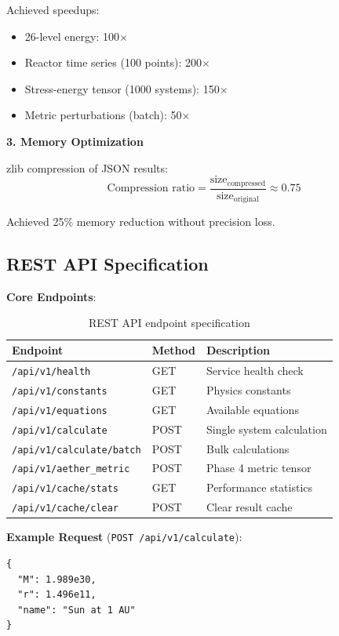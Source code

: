 \documentclass[12pt,a4paper]{article}
\begin{document}
Achieved speedups:
\begin{itemize}
    \item 26-level energy: 100$\times$
    \item Reactor time series (100 points): 200$\times$
    \item Stress-energy tensor (1000 systems): 150$\times$
    \item Metric perturbations (batch): 50$\times$
\end{itemize}

\textbf{3. Memory Optimization}

zlib compression of JSON results:
\begin{equation}
\text{Compression ratio} = \frac{\text{size}_{\text{compressed}}}{\text{size}_{\text{original}}} \approx 0.75
\end{equation}

Achieved 25\% memory reduction without precision loss.

\subsection{REST API Specification}

\textbf{Core Endpoints}:

\begin{table}[H]
\centering
\begin{tabular}{@{}llp{5cm}@{}}
\toprule
\textbf{Endpoint} & \textbf{Method} & \textbf{Description} \\
\midrule
\texttt{/api/v1/health} & GET & Service health check \\
\texttt{/api/v1/constants} & GET & Physics constants \\
\texttt{/api/v1/equations} & GET & Available equations \\
\texttt{/api/v1/calculate} & POST & Single system calculation \\
\texttt{/api/v1/calculate/batch} & POST & Bulk calculations \\
\texttt{/api/v1/aether\_metric} & POST & Phase 4 metric tensor \\
\texttt{/api/v1/cache/stats} & GET & Performance statistics \\
\texttt{/api/v1/cache/clear} & POST & Clear result cache \\
\bottomrule
\end{tabular}
\caption{REST API endpoint specification}
\label{tab:api_endpoints}
\end{table}

\textbf{Example Request} (\texttt{POST /api/v1/calculate}):
\begin{verbatim}
{
  "M": 1.989e30,
  "r": 1.496e11,
  "name": "Sun at 1 AU"
}
\end{verbatim}
\end{document}
